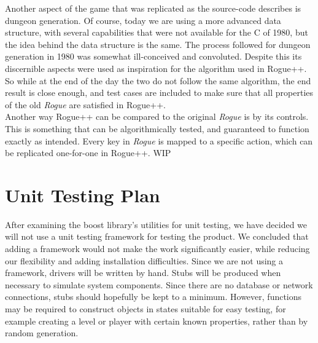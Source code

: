 \documentclass[12pt, titlepage]{article}
\begin{document}
	Another aspect of the game that was replicated as the source-code describes is dungeon generation. Of course, today we are using a more advanced data structure, with several capabilities that were not available for the C of 1980, but the idea behind the data structure is the same. The process followed for dungeon generation in 1980 was somewhat ill-conceived and convoluted. Despite this its discernible aspects were used as inspiration for the algorithm used in Rogue++. So while at the end of the day the two do not follow the same algorithm, the end result is close enough, and test cases are included to make sure that all properties of the old \textit{Rogue} are satisfied in Rogue++.\\

	Another way Rogue++ can be compared to the original \textit{Rogue} is by its controls. This is something that can be algorithmically tested, and guaranteed to function exactly as intended. Every key in \textit{Rogue} is mapped to a specific action, which can be replicated one-for-one in Rogue++. WIP

	
	
\newpage
\section{Unit Testing Plan}
\label{section6}
	
	After examining the boost library's utilities for unit testing, we have decided we will not use a unit testing framework for testing the product. We concluded that adding a framework would not make the work significantly easier, while reducing our flexibility and adding installation difficulties. Since we are not using a framework, drivers will be written by hand. Stubs will be produced when necessary to simulate system components. Since there are no database or network connections, stubs should hopefully be kept to a minimum. However, functions may be required to construct objects in states suitable for easy testing, for example creating a level or player with certain known properties, rather than by random generation.
	
\end{document}
